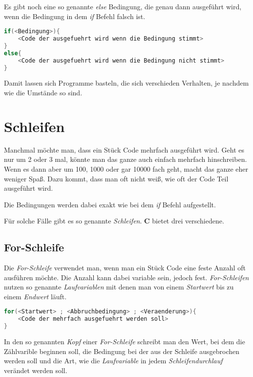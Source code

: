 \documentclass[c_worksheet.tex]{subfiles}
\begin{document}
Es gibt noch eine so genannte \emph{else} Bedingung, die genau dann ausgeführt wird, wenn die Bedingung in dem \emph{if} Befehl falsch ist.

\begin{lstlisting}[language=c]
if(<Bedingung>){
	<Code der ausgefuehrt wird wenn die Bedingung stimmt>
}
else{
	<Code der ausgefuehrt wird wenn die Bedingung nicht stimmt>
}
\end{lstlisting}

Damit lassen sich Programme basteln, die sich verschieden Verhalten, je nachdem wie die Umstände so sind.





\section{Schleifen} 

Manchmal möchte man, dass ein Stück Code mehrfach ausgeführt wird. Geht es nur um 2 oder 3 mal, könnte man das ganze auch einfach mehrfach hinschreiben. Wenn es dann aber um 100, 1000 oder gar 10000 fach geht, macht das ganze eher weniger Spaß. Dazu kommt, dass man oft nicht weiß, wie oft der Code Teil ausgeführt wird.

Die Bedingungen werden dabei exakt wie bei dem \emph{if} Befehl aufgestellt.

Für solche Fälle gibt es so genannte \emph{Schleifen}. \textbf{C} bietet drei verschiedene.

\subsection{For-Schleife}

Die \emph{For-Schleife} verwendet man, wenn man ein Stück Code eine feste Anzahl oft ausführen möchte. Die Anzahl kann dabei variable sein, jedoch fest. \emph{For-Schleifen} nutzen so genannte \emph{Laufvariablen} mit denen man von einem \emph{Startwert} bis zu einem \emph{Endwert} läuft.

\begin{lstlisting}[language=c]
for(<Startwert> ; <Abbruchbedingung> ; <Veraenderung>){
	<Code der mehrfach ausgefuehrt werden soll>
}
\end{lstlisting}

In den so genannten \emph{Kopf} einer \emph{For-Schleife} schreibt man den Wert, bei dem die Zählvarible beginnen soll, die Bedingung bei der aus der Schleife ausgebrochen werden soll und die Art, wie die \emph{Laufvariable} in jedem \emph{Schleifendurchlauf} verändet werden soll.
\end{document}

